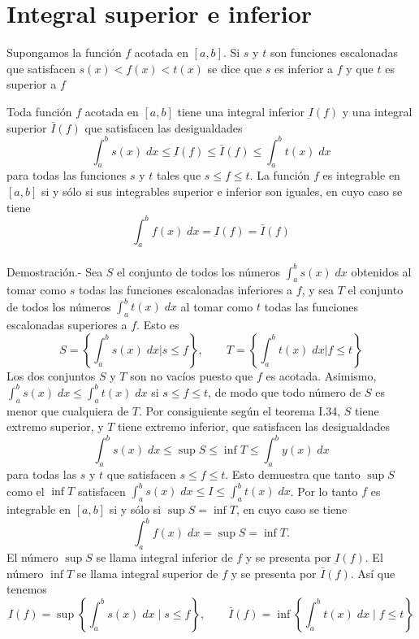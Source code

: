 \section{Integral superior e inferior}

\begin{tcolorbox}[colframe=white]
    \begin{def.}
	Supongamos la función $f$ acotada en $[a,b]$. Si $s$ y $t$ son funciones escalonadas que satisfacen $s(x)<f(x)<t(x)$ se dice que $s$ es inferior a $f$ y que $t$ es superior a $f$
    \end{def.}
\end{tcolorbox}

\begin{teo}
    Toda función $f$ acotada en $[a,b]$ tiene una integral inferior $\underbar{I}(f)$ y una integral superior $\bar{I}(f)$ que satisfacen las desigualdades $$\int_a^b s(x) \; dx \leq \underbar{I}(f) \leq \bar{I}(f) \leq \int_a^b t(x) \; dx$$ 
    para todas las funciones $s$ y $t$ tales que $s\leq f\leq t$. La función $f$ es integrable en $[a,b]$ si y sólo si sus integrables superior e inferior son iguales, en cuyo caso se tiene $$\int_a^b f(x) \; dx = \underbar{I}(f)=\bar{I}(f)$$\\
    Demostración.-\; Sea $S$ el conjunto de todos los números $\int_a^b s(x)\; dx$ obtenidos al tomar como $s$ todas las funciones escalonadas inferiores a $f$, y sea $T$ el conjunto de todos los números $\int_a^b t(x)\; dx$ al tomar como $t$ todas las funciones escalonadas superiores a $f$. Esto es $$ S=\left\{ \int_a^b s(x)\; dx | s\leq f\right\}, \qquad T=\left\{ \int_a^b t(x)\; dx | f\leq t\right\}$$ 
    Los dos conjuntos $S$ y $T$ son no vacíos puesto que $f$ es acotada. Asimismo, $\int_a^b s(x)\; dx \leq \int_a^b t(x)\; dx$ si $s\leq f \leq t$, de modo que todo número de $S$ es menor que cualquiera de $T$. Por consiguiente según el teorema I.34, $S$ tiene extremo superior, y $T$ tiene extremo inferior, que satisfacen las desigualdades $$\int_a^b s(x)\; dx \leq \sup S \leq \inf T \leq \int_a^b y(x)\; dx$$
    para todas las $s$ y $t$ que satisfacen $s\leq f\leq t$. Esto demuestra que tanto $\sup S$ como el $\inf T$ satisfacen $\int_a^b s(x)\; dx \leq I\leq \int_a^b t(x)\; dx$. Por lo tanto $f$ es integrable en $[a,b]$ si y sólo si $\sup S = \inf T$, en cuyo caso se tiene $$\int_a^b f(x)\; dx = \sup S = \inf T.$$
    El número $\sup S$ se llama integral inferior de $f$ y se presenta por $\underbar{I}(f)$. El número $\inf T$ se llama integral superior de $f$ y se presenta por $\bar{I}(f)$. Así que tenemos 
    $$\underbar{I}(f)=\sup \left\{\int_a^b s(x) \; dx \; | \; s\leq f\right\}, \qquad \bar{I}(f)=\inf \left\{\int_a^b t(x) \; dx \; | \; f\leq t\right\}$$\\\\
\end{teo}

